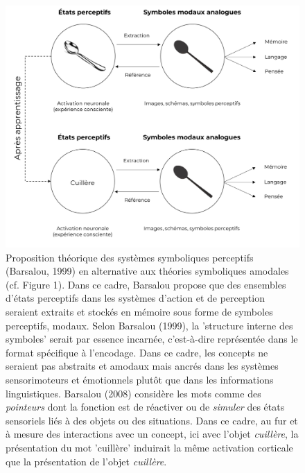 \documentclass[
  a4paper,12pt,twoside,onecolumn,openright,final,oldfontcommands]{memoir}
\begin{document}
\begin{figure}[htbp!]

{\centering \includegraphics[width=1\linewidth]{figures/chap1-fig3} 

}

\caption{Proposition théorique des systèmes symboliques perceptifs (Barsalou, 1999) en alternative aux théories symboliques amodales (cf. Figure 1). Dans ce cadre, Barsalou propose que des ensembles d'états perceptifs dans les systèmes d'action et de perception seraient extraits et stockés en mémoire sous forme de symboles perceptifs, modaux. Selon Barsalou (1999), la 'structure interne des symboles' serait par essence incarnée, c'est-à-dire représentée dans le format spécifique à l'encodage. Dans ce cadre, les concepts ne seraient pas abstraits et amodaux mais ancrés dans les systèmes sensorimoteurs et émotionnels plutôt que dans les informations linguistiques. Barsalou (2008) considère les mots comme des \textit{pointeurs} dont la fonction est de réactiver ou de \textit{simuler} des états sensoriels liés à des objets ou des situations. Dans ce cadre, au fur et à mesure des interactions avec un concept, ici avec l'objet \textit{cuillère}, la présentation du mot 'cuillère' induirait la même activation corticale que la présentation de l'objet \textit{cuillère}.}\label{fig:chap1-fig3}
\end{figure}
\end{document}
